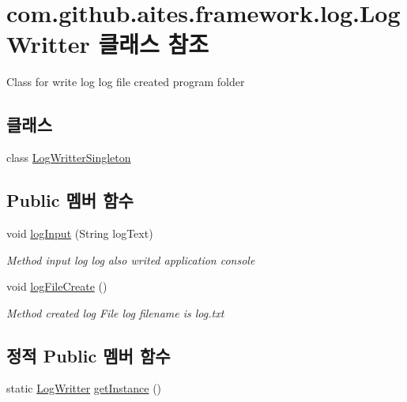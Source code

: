 \hypertarget{classcom_1_1github_1_1aites_1_1framework_1_1log_1_1_log_writter}{}\section{com.\+github.\+aites.\+framework.\+log.\+Log\+Writter 클래스 참조}
\label{classcom_1_1github_1_1aites_1_1framework_1_1log_1_1_log_writter}


Class for write log log file created program folder  


\subsection*{클래스}
\begin{DoxyCompactItemize}
\item 
class \mbox{\hyperlink{classcom_1_1github_1_1aites_1_1framework_1_1log_1_1_log_writter_1_1_log_writter_singleton}{Log\+Writter\+Singleton}}
\end{DoxyCompactItemize}
\subsection*{Public 멤버 함수}
\begin{DoxyCompactItemize}
\item 
void \mbox{\hyperlink{classcom_1_1github_1_1aites_1_1framework_1_1log_1_1_log_writter_ad2c412c85ba5932c7fa4f920c50f44c9}{log\+Input}} (String log\+Text)
\begin{DoxyCompactList}\small\item\em Method input log log also writed application console \end{DoxyCompactList}\item 
void \mbox{\hyperlink{classcom_1_1github_1_1aites_1_1framework_1_1log_1_1_log_writter_a2640594d456b80388821352e84b3c690}{log\+File\+Create}} ()
\begin{DoxyCompactList}\small\item\em Method created log File log filename is log.\+txt \end{DoxyCompactList}\end{DoxyCompactItemize}
\subsection*{정적 Public 멤버 함수}
\begin{DoxyCompactItemize}
\item 
static \mbox{\hyperlink{classcom_1_1github_1_1aites_1_1framework_1_1log_1_1_log_writter}{Log\+Writter}} \mbox{\hyperlink{classcom_1_1github_1_1aites_1_1framework_1_1log_1_1_log_writter_a2f315148575291db6f24553791068c42}{get\+Instance}} ()
\end{DoxyCompactItemize}
